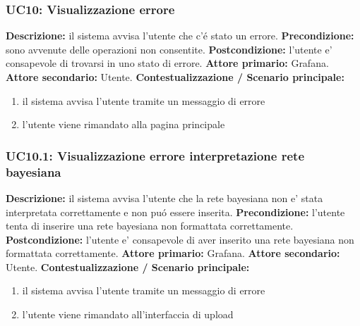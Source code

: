                 \subsubsection{UC10: Visualizzazione errore}
                    \textbf{Descrizione:}  il sistema avvisa l’utente che c’é stato un errore.
                    \newline
                    \textbf{Precondizione:} sono avvenute delle operazioni non consentite.
                    \newline
                    \textbf{Postcondizione:} l’utente e’ consapevole di trovarsi in uno stato di errore.
                    \newline
                    \textbf{Attore primario:} Grafana.
                    \newline
                    \textbf{Attore secondario:} Utente.
                    \newline
                    \textbf{Contestualizzazione / Scenario principale:} \begin{enumerate}
                            \item il sistema avvisa l’utente tramite un messaggio di errore
                            \item l’utente viene rimandato alla pagina principale
                        \end{enumerate}
                        
                \subsubsection{UC10.1: Visualizzazione errore interpretazione rete bayesiana}
                    \textbf{Descrizione:}  il sistema avvisa l’utente che la rete bayesiana non e’ stata interpretata correttamente e non puó essere inserita.
                    \newline
                    \textbf{Precondizione:} l’utente tenta di inserire una rete bayesiana non formattata correttamente.
                    \newline
                    \textbf{Postcondizione:} l’utente e’ consapevole di aver inserito una rete bayesiana non formattata correttamente.
                    \newline
                    \textbf{Attore primario:} Grafana.
                    \newline
                    \textbf{Attore secondario:} Utente.
                    \newline
                    \textbf{Contestualizzazione / Scenario principale:} \begin{enumerate}
                            \item il sistema avvisa l’utente tramite un messaggio di errore
                            \item l’utente viene rimandato all’interfaccia di upload
                        \end{enumerate}
                
